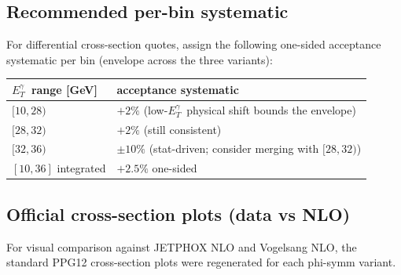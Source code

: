 \documentclass[11pt,a4paper]{article}
\newcommand{\etg}{\ensuremath{E_T^\gamma}}
\begin{document}
\subsection{Recommended per-bin systematic}

For differential cross-section quotes, assign the following
one-sided acceptance systematic per bin (envelope across the three
variants):

\begin{center}
\begin{tabular}{ll}
\toprule
\etg\ range [GeV] & acceptance systematic \\
\midrule
$[10, 28)$       & $+2\%$ (low-\etg\ physical shift bounds the envelope) \\
$[28, 32)$       & $+2\%$ (still consistent) \\
$[32, 36)$       & $\pm 10\%$ (stat-driven; consider merging with $[28, 32)$) \\
\midrule
$[10, 36]$ integrated & $+2.5\%$ one-sided \\
\bottomrule
\end{tabular}
\end{center}

\subsection{Official cross-section plots (data vs NLO)}
\label{sec:official_xsec}

For visual comparison against JETPHOX NLO and Vogelsang NLO, the
standard PPG12 cross-section plots were regenerated for each
phi-symm variant.
\end{document}
